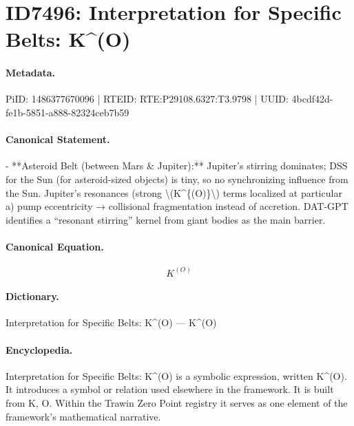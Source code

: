 \section*{ID7496: Interpretation for Specific Belts: K\textasciicircum{}(O)}
\paragraph{Metadata.}
PiID: 1486377670096 | RTEID: RTE:P29108.6327:T3.9798 | UUID: 4bcdf42d-fe1b-5851-a888-82324ceb7b59

\paragraph{Canonical Statement.}
- **Asteroid Belt (between Mars \& Jupiter):** Jupiter’s stirring dominates; DSS for the Sun (for asteroid-sized objects) is tiny, so no synchronizing influence from the Sun. Jupiter’s resonances (strong \textbackslash{}(K\textasciicircum{}\{(O)\}\textbackslash{}) terms localized at particular a) pump eccentricity → collisional fragmentation instead of accretion. DAT-GPT identifies a “resonant stirring” kernel from giant bodies as the main barrier.

\paragraph{Canonical Equation.}
\[
K^{(O)}
\]

\paragraph{Dictionary.}
Interpretation for Specific Belts: K\textasciicircum{}(O) — K\textasciicircum{}(O)

\paragraph{Encyclopedia.}
Interpretation for Specific Belts: K\textasciicircum{}(O) is a symbolic expression, written K\textasciicircum{}(O). It introduces a symbol or relation used elsewhere in the framework. It is built from K, O. Within the Trawin Zero Point registry it serves as one element of the framework's mathematical narrative.
